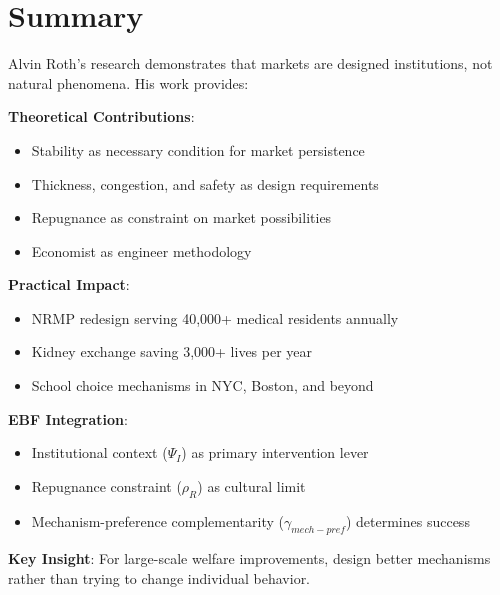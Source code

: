 \section{Summary}

\begin{tcolorbox}[colback=gray!5!white,colframe=gray!75!black,title=Chapter Summary]
Alvin Roth's research demonstrates that markets are designed institutions, not natural phenomena. His work provides:

\textbf{Theoretical Contributions}:
\begin{itemize}
    \item Stability as necessary condition for market persistence
    \item Thickness, congestion, and safety as design requirements
    \item Repugnance as constraint on market possibilities
    \item Economist as engineer methodology
\end{itemize}

\textbf{Practical Impact}:
\begin{itemize}
    \item NRMP redesign serving 40,000+ medical residents annually
    \item Kidney exchange saving 3,000+ lives per year
    \item School choice mechanisms in NYC, Boston, and beyond
\end{itemize}

\textbf{EBF Integration}:
\begin{itemize}
    \item Institutional context ($\Psi_I$) as primary intervention lever
    \item Repugnance constraint ($\rho_R$) as cultural limit
    \item Mechanism-preference complementarity ($\gamma_{mech-pref}$) determines success
\end{itemize}

\textbf{Key Insight}: For large-scale welfare improvements, design better mechanisms rather than trying to change individual behavior.
\end{tcolorbox}

